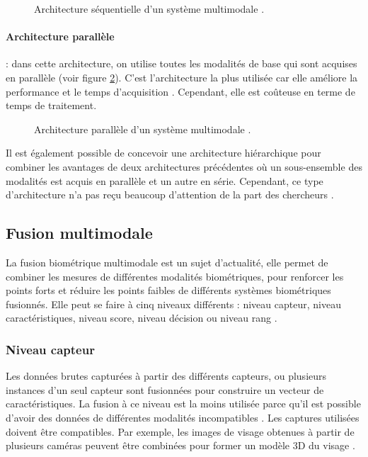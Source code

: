 	\begin{center}
		\begin{figure}[H]
			\centering
			\caption{Architecture séquentielle d'un système multimodale \citep{ross2006information}.}
			\label{fig:chapitre1archiseq}
		\end{figure}
	\end{center}
\paragraph*{Architecture parallèle }: dans cette architecture, on utilise toutes les modalités de base qui sont acquises en parallèle (voir figure \ref{fig:chapitre1archipar}). C'est l'architecture la plus utilisée car elle améliore la performance et le temps d’acquisition \citep{hong1998integrating}. Cependant, elle est coûteuse en terme de temps de traitement.
	\begin{center}
		\begin{figure}[H]
			\centering
			\caption{Architecture parallèle d'un système multimodale \citep{ross2006information}.}
			\label{fig:chapitre1archipar}
		\end{figure}
	\end{center}

Il est également possible de concevoir une architecture hiérarchique pour combiner les avantages de deux architectures précédentes où un sous-ensemble des modalités est acquis en parallèle et un autre en série. Cependant, ce type d'architecture n'a pas reçu beaucoup d'attention de la part des chercheurs \citep{ross2006information}.
\subsection{Fusion multimodale}
\label{fusionetat}
La fusion biométrique multimodale est un sujet d'actualité, elle permet de combiner les mesures de différentes modalités biométriques, pour renforcer les points forts et réduire les points faibles de différents systèmes biométriques fusionnés. Elle peut se faire à cinq niveaux différents : niveau capteur, niveau caractéristiques, niveau score, niveau décision ou niveau rang \citep{C.SandersonandK.Paliwal.2002}. 

\subsubsection{Niveau capteur}
Les données brutes capturées à partir des différents capteurs, ou plusieurs instances d'un seul capteur sont fusionnées pour construire un vecteur de caractéristiques. La fusion à ce niveau est la moins utilisée parce qu’il est possible d'avoir des données de différentes modalités incompatibles \citep{gudavalli2012multimodal}. Les captures utilisées doivent être compatibles. Par exemple, les images de visage obtenues à partir de plusieurs caméras peuvent être combinées pour former un modèle 3D du visage \citep{noore2015fusion}.
